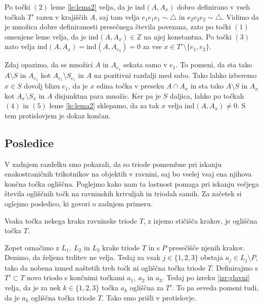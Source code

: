 \documentclass[mat1]{fmfdelo}
\newcommand{\Z}{\mathbb Z}
\newcommand{\ind}[3][]{\text{ind}_{#1}(#2, #3)}
\begin{document}
Po točki $(2)$ leme \ref{le:lema2} velja, da je $\ind{A}{A_x}$ dobro definirano v vseh točkah $T'$ razen v krajiščih $A$, saj tam velja $e_1e_1e_1 \sim \triangle$ in $e_2e_2e_2 \sim \triangle$. Vidimo da je množica dobre definiranosti presečnega števila povezana, zato po točki $(1)$ omenjene leme velja, da je $\ind{A}{A_x} \in \Z$ na njej konstantna. Po točki $(3)$ nato velja $\ind{A}{A_x} = \ind{A}{A_{e_3}} = 0$ za vse $x \in T' \setminus \{e_1, e_2\}$.

Zdaj opazimo, da se množici $A$ in $A_{e_1}$ sekata samo v $e_1$. To pomeni, da sta tako $A\setminus S$ in $A_{e_1}$ kot $A_{e_1}\setminus S_{e_1}$ in $A$ na pozitivni razdalji med sabo. Tako lahko izberemo $x \in S$ dovolj blizu $e_1$, da je $x$ edina točka v preseku $A \cap A_x$ in sta tako $A\setminus S$ in $A_x$ kot $A_x \setminus S_x$ in $A$ disjunktna para množic. Ker pa je $S$ daljica, lahko po točkah $(4)$ in $(5)$ leme \ref{le:lema2} sklepamo, da za tak $x$ velja $\ind{A}{A_x} \neq 0$. S tem protislovjem je dokaz končan.
\endproof

\subsection{Posledice}
V zadnjem razdelku smo pokazali, da so triode pomembne pri iskanju enakostraničnih trikotnikov na objektih v ravnini, saj bo vselej vsaj ena njihova končna točka ogliščna. Poglejmo kako nam ta lastnost pomaga pri iskanju večjega števila ogliščnih točk na ravninskih krivuljah in triodah samih. Za začetek si oglejmo posledico, ki govori o zadnjem primeru.
\begin{posledica}\label{posl:trioda}
Vsaka točka nekega kraka ravninske triode $T$, z izjemo stičišča krakov, je ogliščna točka $T$.
\end{posledica}

\proof
Zopet označimo z $L_1,\ L_2$ in $L_3$ krake triode $T$ in s $P$ presečišče njenih krakov. Denimo, da željena trditev ne velja. Tedaj za vsak $j \in \{1, 2, 3\}$ obstaja $a_j \in L_j \setminus P$, tako da nobena izmed naštetih treh točk ni ogliščna točka triode $T$. Definirajmo s $T' \subset T$ novo triodo s končnimi točkami $a_1,\ a_2$ in $a_3$. Tedaj po izreku \ref{izr:glavni} velja, da je za nek $k \in \{1, 2, 3\}$ točka $a_k$ ogliščna za $T'$. To pa seveda pomeni tudi, da je $a_k$ ogliščna točka triode $T$. Tako smo prišli v protislovje.
\endproof
\end{document}
